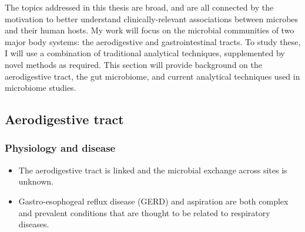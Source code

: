 \documentclass[12pt]{article}
\begin{document}
The topics addressed in this thesis are broad, and are all connected by
the motivation to better understand
clinically-relevant associations between microbes and their human hosts.
My work will focus on the microbial communities of two major body systems:
the aerodigestive and gastrointestinal tracts. To study these, I will 
use a combination of traditional analytical techniques, supplemented by 
novel methods as required. This section will provide background on
the aerodigestive tract, the gut microbiome, and current analytical techniques 
used in microbiome studies. 

\subsection{Aerodigestive tract}

\subsubsection{Physiology and disease}

\begin{itemize}
\item The aerodigestive tract is linked and the microbial exchange across
sites is unknown.
\item Gastro-esophogeal reflux disease (GERD) and aspiration are both complex and prevalent conditions that are thought to be related to respiratory diseases.
\end{itemize}
\end{document}
